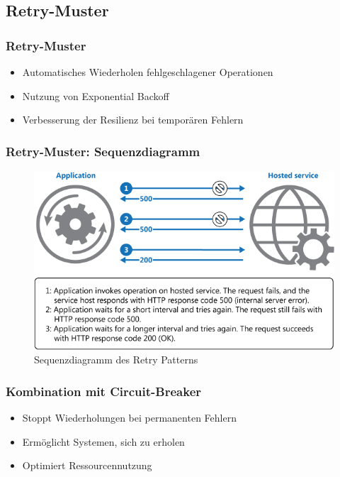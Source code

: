 \subsection{Retry-Muster}

\begin{frame}
    \frametitle{Retry-Muster}
    \begin{itemize}
        \item Automatisches Wiederholen fehlgeschlagener Operationen
        \item Nutzung von Exponential Backoff
        \item Verbesserung der Resilienz bei temporären Fehlern
    \end{itemize}
\end{frame}

\begin{frame}
    \frametitle{Retry-Muster: Sequenzdiagramm}
    \begin{figure}[h]
        \centering
        \includegraphics[height=0.5\textheight]{images/retry-pattern}
        \caption{Sequenzdiagramm des Retry Patterns}
    \end{figure}
\end{frame}

\begin{frame}
    \frametitle{Kombination mit Circuit-Breaker}
    \begin{itemize}
        \item Stoppt Wiederholungen bei permanenten Fehlern
        \item Ermöglicht Systemen, sich zu erholen
        \item Optimiert Ressourcennutzung
    \end{itemize}
\end{frame}

